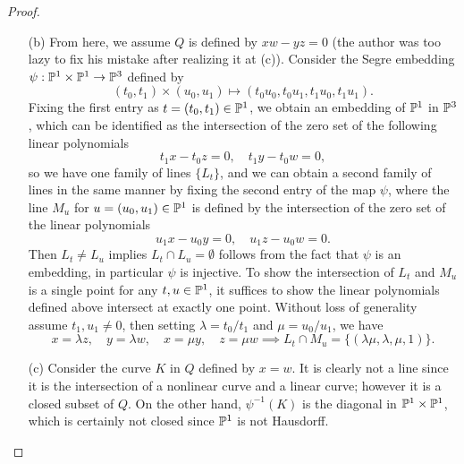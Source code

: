 \documentclass{article}
\begin{document}
\begin{enumerate} [label=\textbf{\arabic*.}, leftmargin=0cm]
\begin{proof}
\begin{itemize} [leftmargin=0cm]
        \item[(b)] From here, we assume $Q$ is defined by $xw - yz = 0$ (the author was too lazy to fix his mistake after realizing it at (c)). Consider the Segre embedding $\psi : \mathbb{P}^1 \times \mathbb{P}^1 \to \mathbb{P}^3$ defined by
        \begin{equation*}
            (t_0, t_1) \times (u_0, u_1) \mapsto (t_0 u_0, t_0 u_1, t_1 u_0, t_1 u_1).
        \end{equation*}
        Fixing the first entry as $t = (t_0, t_1) \in \mathbb{P}^1$, we obtain an embedding of $\mathbb{P}^1$ in $\mathbb{P}^3$, which can be identified as the intersection of the zero set of the following linear polynomials
        \begin{equation*}
            t_1 x - t_0 z = 0, \quad t_1 y - t_0 w = 0,
        \end{equation*}
        so we have one family of lines $\{ L_t \}$, and we can obtain a second family of lines in the same manner by fixing the second entry of the map $\psi$, where the line $M_u$ for $u = (u_0, u_1) \in \mathbb{P}^1$ is defined by the intersection of the zero set of the linear polynomials
        \begin{equation*}
            u_1 x - u_0 y = 0, \quad u_1 z - u_0 w = 0.
        \end{equation*}
        Then $L_t \neq L_u$ implies $L_t \cap L_u = \emptyset$ follows from the fact that $\psi$ is an embedding, in particular $\psi$ is injective. To show the intersection of $L_t$ and $M_u$ is a single point for any $t, u \in \mathbb{P}^1$, it suffices to show the linear polynomials defined above intersect at exactly one point. Without loss of generality assume $t_1, u_1 \neq 0$, then setting $\lambda = t_0 / t_1$ and $\mu = u_0 / u_1$, we have
        \begin{equation*}
            x = \lambda z, \quad y = \lambda w, \quad x = \mu y, \quad z = \mu w \implies L_t \cap M_u = \{ (\lambda \mu, \lambda, \mu, 1) \}.
        \end{equation*}

        \item[(c)] Consider the curve $K$ in $Q$ defined by $x = w$. It is clearly not a line since it is the intersection of a nonlinear curve and a linear curve; however it is a closed subset of $Q$. On the other hand, $\psi^{-1}(K)$ is the diagonal in $\mathbb{P}^1 \times \mathbb{P}^1$, which is certainly not closed since $\mathbb{P}^1$ is not Hausdorff.
    \end{itemize} 
\end{proof}

\end{enumerate}
\end{document}
